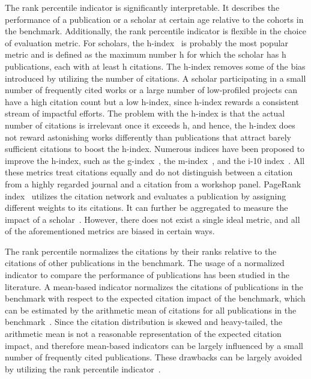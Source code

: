 The rank percentile indicator is significantly interpretable. It describes the performance of a publication or a scholar at certain age relative to the cohorts in the benchmark. Additionally, the rank percentile indicator is flexible in the choice of evaluation metric. For scholars, the h-index~\cite{hirsch2005index} is probably the most popular metric and is defined as the maximum number h for which the scholar has h publications, each with at least h citations. The h-index removes some of the bias introduced by utilizing the number of citations. A scholar participating in a small number of frequently cited works or a large number of low-profiled projects can have a high citation count but a low h-index, since h-index rewards a consistent stream of impactful efforts. The problem with the h-index is that the actual number of citations is irrelevant once it exceeds h, and hence, the h-index does not reward astonishing works differently than publications that attract barely sufficient citations to boost the h-index. Numerous indices have been proposed to improve the h-index, such as the g-index~\cite{egghe2006theory}, the m-index~\cite{hirsch2005index}, and the i-10 index~\cite{Connor2011}. All these metrics treat citations equally and do not distinguish between a citation from a highly regarded journal and a citation from a workshop panel. PageRank index~\cite{chen2007finding,walker2007ranking,ma2008bringing} utilizes the citation network and evaluates a publication by assigning different weights to its citations. It can further be aggregated to measure the impact of a scholar~\cite{senanayake2015pagerank}. However, there does not exist a single ideal metric, and all of the aforementioned metrics are biased in certain ways. 

The rank percentile normalizes the citations by their ranks relative to the citations of other publications in the benchmark. The usage of a normalized indicator to compare the performance of publications has been studied in the literature. A mean-based indicator normalizes the citations of publications in the benchmark with respect to the expected citation impact of the benchmark, which can be estimated by the arithmetic mean of citations for all publications in the benchmark~\cite{schubert1986relative}. Since the citation distribution is skewed and heavy-tailed, the arithmetic mean is not a reasonable representation of the expected citation impact, and therefore mean-based indicators can be largely influenced by a small number of frequently cited publications. These drawbacks can be largely avoided by utilizing the rank percentile indicator~\cite{bornmann2013use,mingers2015review,bornmann2019well}.

